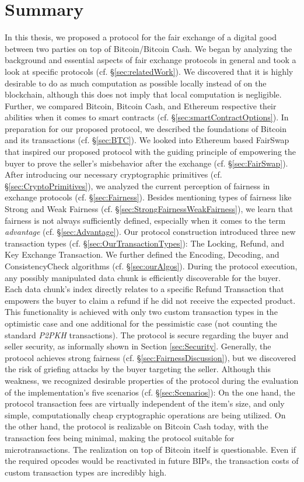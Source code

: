 \documentclass{cacthesis}
\newcounter{protocol}
\begin{document}
	\section{Summary}
    In this thesis, we proposed a protocol for the fair exchange of a digital good between two parties on top of Bitcoin/Bitcoin Cash. We began by analyzing the background and essential aspects of fair exchange protocols in general and took a look at specific protocols (cf. §\ref{sec:relatedWork}). We discovered that it is highly desirable to do as much computation as possible locally instead of on the blockchain, although this does not imply that local computation is negligible. Further, we compared Bitcoin, Bitcoin Cash, and Ethereum respective their abilities when it comes to smart contracts (cf. §\ref{sec:smartContractOptions}). In preparation for our proposed protocol, we described the foundations of Bitcoin and its transactions (cf. §\ref{sec:BTC}). We looked into Ethereum based FairSwap that inspired our proposed protocol with the guiding principle of empowering the buyer to prove the seller's misbehavior after the exchange (cf. §\ref{sec:FairSwap}). After introducing our necessary cryptographic primitives (cf. §\ref{sec:CryptoPrimitives}), we analyzed the current perception of fairness in exchange protocols (cf. §\ref{sec:Fairness}). Besides mentioning types of fairness like Strong and Weak Fairness (cf. §\ref{sec:StrongFairnessWeakFairness}), we learn that fairness is not always sufficiently defined, especially when it comes to the term \textit{advantage} (cf. §\ref{sec:Advantage}). Our protocol construction introduced three new transaction types (cf. §\ref{sec:OurTransactionTypes}): The Locking, Refund, and Key Exchange Transaction. We further defined the \textsf{Encoding}, \textsf{Decoding}, and \textsf{ConsistencyCheck} algorithms (cf. §\ref{sec:ourAlgos}). During the protocol execution, any possibly manipulated data chunk is efficiently discoverable for the buyer. Each data chunk's index directly relates to a specific Refund Transaction that empowers the buyer to claim a refund if he did not receive the expected product. This functionality is achieved with only two custom transaction types in the optimistic case and one additional for the pessimistic case (not counting the standard \textit{P2PKH} transactions). The protocol is secure regarding the buyer and seller security, as informally shown in Section \ref{sec:Security}. Generally, the protocol achieves strong fairness (cf. §\ref{sec:FairnessDiscussion}), but we discovered the risk of griefing attacks by the buyer targeting the seller.  Although this weakness, we recognized desirable properties of the protocol during the evaluation of the implementation's five scenarios (cf. §\ref{sec:Scenarios}): On the one hand, the protocol transaction fees are virtually independent of the item's size, and only simple, computationally cheap cryptographic operations are being utilized. On the other hand, the protocol is realizable on Bitcoin Cash today, with the transaction fees being minimal, making the protocol suitable for microtransactions. The realization on top of Bitcoin itself is questionable. Even if the required opcodes would be reactivated in future BIPs, the transaction costs of custom transaction types are incredibly high.  
\end{document}
